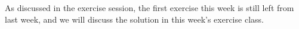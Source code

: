 \documentclass[a4paper]{article}
\begin{document}

% 


As discussed in the exercise session, the first exercise this week is still left from last week, and we will discuss the solution in this week's exercise class.



\dlz



\dlz


\end{document}
